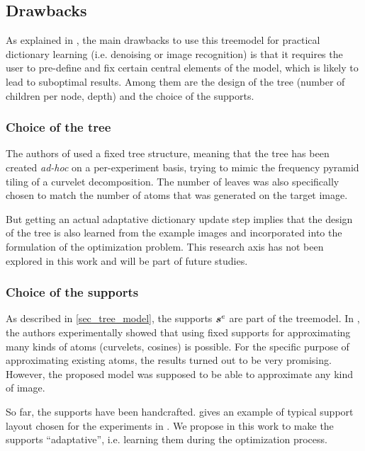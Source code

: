 \subsection{Drawbacks}
As explained in \cite[p. 23]{chabiron_optimization_2016}, the main drawbacks to use this \gls{treemodel} for practical dictionary learning (i.e. denoising or image recognition) is that it requires the user to pre-define and fix certain central elements of the model, which is likely to lead to suboptimal results. Among them are the design of the tree (number of children per node, depth) and the choice of the supports.
\subsubsection{Choice of the tree}
The authors of \cite{chabiron_optimization_2016} used a fixed tree structure, meaning that the tree has been created \emph{ad-hoc} on a per-experiment basis, trying to mimic the frequency pyramid tiling of a curvelet decomposition. The number of leaves was also specifically chosen to match the number of atoms that was generated on the target image.

But getting an actual adaptative dictionary update step implies that the design of the tree is also learned from the example images and incorporated into the formulation of the optimization problem. This research axis has not been explored in this work and will be part of future studies.

\subsubsection{Choice of the supports}

As described in \cref{sec_tree_model}, the supports $\bm{s}^e$ are part of the \gls{treemodel}. In \cite{chabiron_toward_2015}, the authors experimentally showed that using fixed supports for approximating many kinds of atoms (curvelets, cosines) is possible. For the specific purpose of approximating existing atoms, the results turned out to be very promising. However, the proposed model was supposed to be able to approximate any kind of image.

So far, the supports have been handcrafted.  gives an example of typical support layout chosen for the experiments in \cite{chabiron_optimization_2016}. We propose in this work to make the supports “adaptative”, i.e. learning them during the optimization process.

